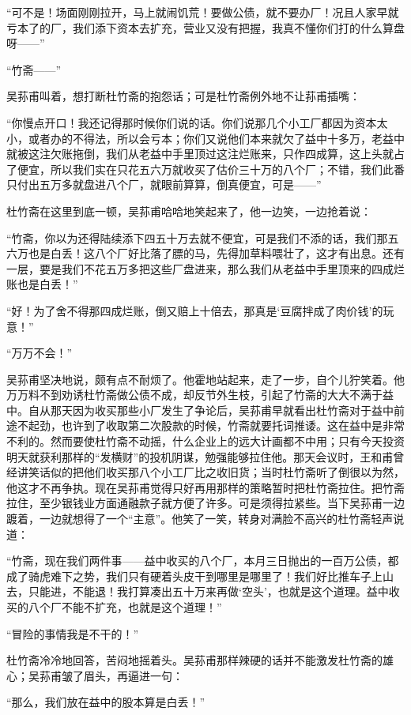 \par “可不是！场面刚刚拉开，马上就闹饥荒！要做公债，就不要办厂！况且人家早就亏本了的厂，我们添下资本去扩充，营业又没有把握，我真不懂你们打的什么算盘呀——”
\par “竹斋——”
\par 吴荪甫叫着，想打断杜竹斋的抱怨话；可是杜竹斋例外地不让荪甫插嘴：
\par “你慢点开口！我还记得那时候你们说的话。你们说那几个小工厂都因为资本太小，或者办的不得法，所以会亏本；你们又说他们本来就欠了益中十多万，老益中就被这注欠账拖倒，我们从老益中手里顶过这注烂账来，只作四成算，这上头就占了便宜，所以我们实在只花五六万就收买了估价三十万的八个厂；不错，我们此番只付出五万多就盘进八个厂，就眼前算算，倒真便宜，可是——”
\par 杜竹斋在这里到底一顿，吴荪甫哈哈地笑起来了，他一边笑，一边抢着说：
\par “竹斋，你以为还得陆续添下四五十万去就不便宜，可是我们不添的话，我们那五六万也是白丢！这八个厂好比落了膘的马，先得加草料喂壮了，这才有出息。还有一层，要是我们不花五万多把这些厂盘进来，那么我们从老益中手里顶来的四成烂账也是白丢！”
\par “好！为了舍不得那四成烂账，倒又赔上十倍去，那真是‘豆腐拌成了肉价钱’的玩意！”
\par “万万不会！”
\par 吴荪甫坚决地说，颇有点不耐烦了。他霍地站起来，走了一步，自个儿狞笑着。他万万料不到劝诱杜竹斋做公债不成，却反节外生枝，引起了竹斋的大大不满于益中。自从那天因为收买那些小厂发生了争论后，吴荪甫早就看出杜竹斋对于益中前途不起劲，也许到了收取第二次股款的时候，竹斋就要托词推诿。这在益中是非常不利的。然而要使杜竹斋不动摇，什么企业上的远大计画都不中用；只有今天投资明天就获利那样的“发横财”的投机阴谋，勉强能够拉住他。那天会议时，王和甫曾经讲笑话似的把他们收买那八个小工厂比之收旧货；当时杜竹斋听了倒很以为然，他这才不再争执。现在吴荪甫觉得只好再用那样的策略暂时把杜竹斋拉住。把竹斋拉住，至少银钱业方面通融款子就方便了许多。可是须得拉紧些。当下吴荪甫一边踱着，一边就想得了一个“主意”。他笑了一笑，转身对满脸不高兴的杜竹斋轻声说道：
\par “竹斋，现在我们两件事——益中收买的八个厂，本月三日抛出的一百万公债，都成了骑虎难下之势，我们只有硬着头皮干到哪里是哪里了！我们好比推车子上山去，只能进，不能退！我打算凑出五十万来再做‘空头’，也就是这个道理。益中收买的八个厂不能不扩充，也就是这个道理！”
\par “冒险的事情我是不干的！”
\par 杜竹斋冷冷地回答，苦闷地摇着头。吴荪甫那样辣硬的话并不能激发杜竹斋的雄心；吴荪甫皱了眉头，再逼进一句：
\par “那么，我们放在益中的股本算是白丢！”
